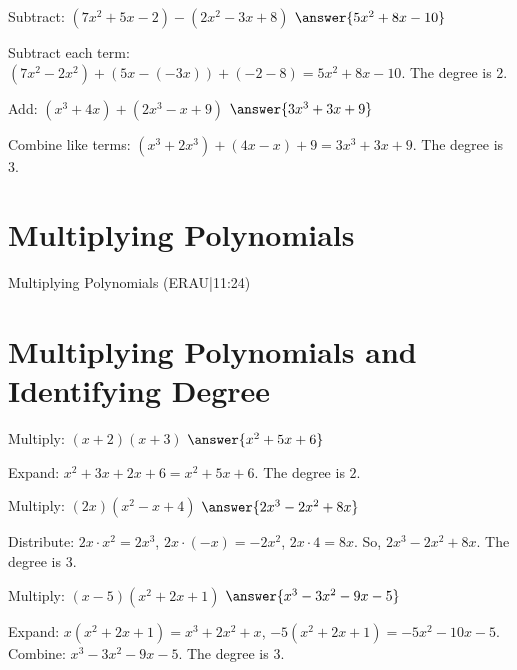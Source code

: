 \documentclass{ximera}
\begin{document}
\begin{problem}
Subtract: $(7x^2 + 5x - 2) - (2x^2 - 3x + 8)$ $\answer{5x^2 + 8x - 10}$
\begin{feedback}
Subtract each term: $(7x^2 - 2x^2) + (5x - (-3x)) + (-2 - 8) = 5x^2 + 8x - 10$. The degree is $2$.
\end{feedback}
\end{problem}

\begin{problem}
Add: $(x^3 + 4x) + (2x^3 - x + 9)$ $\answer{3x^3 + 3x + 9}$
\begin{feedback}
Combine like terms: $(x^3 + 2x^3) + (4x - x) + 9 = 3x^3 + 3x + 9$. The degree is $3$.
\end{feedback}
\end{problem}


\section*{Multiplying Polynomials}

Multiplying Polynomials (ERAU|11:24)



\section*{Multiplying Polynomials and Identifying Degree}

\begin{problem}
Multiply: $(x + 2)(x + 3)$ $\answer{x^2 + 5x + 6}$
\begin{feedback}
Expand: $x^2 + 3x + 2x + 6 = x^2 + 5x + 6$. The degree is $2$.
\end{feedback}
\end{problem}

\begin{problem}
Multiply: $(2x)(x^2 - x + 4)$ $\answer{2x^3 - 2x^2 + 8x}$
\begin{feedback}
Distribute: $2x \cdot x^2 = 2x^3$, $2x \cdot (-x) = -2x^2$, $2x \cdot 4 = 8x$. So, $2x^3 - 2x^2 + 8x$. The degree is $3$.
\end{feedback}
\end{problem}

\begin{problem}
Multiply: $(x - 5)(x^2 + 2x + 1)$ $\answer{x^3 - 3x^2 - 9x - 5}$
\begin{feedback}
Expand: $x(x^2 + 2x + 1) = x^3 + 2x^2 + x$, $-5(x^2 + 2x + 1) = -5x^2 - 10x - 5$. Combine: $x^3 - 3x^2 - 9x - 5$. The degree is $3$.
\end{feedback}
\end{problem}
\end{document}

